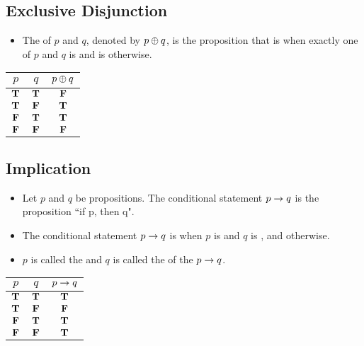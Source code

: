   \subsection{Exclusive Disjunction}
      \begin{itemize}
        \item The  of $p$ and $q$, denoted by $p \oplus q$, is the proposition that is  when
        exactly one of $p$ and $q$ is  and is  otherwise.
      \end{itemize}

    \begin{center}
      \begin{tabular}{|c|c|c|}
        \hline
        $p$ & $q$ & $p \oplus q$ \\
        \hline
        $\mathbf{T}$ & $\mathbf{T}$ & $\mathbf{F}$ \\
        \hline
        $\mathbf{T}$ & $\mathbf{F}$ & $\mathbf{T}$ \\
        \hline
        $\mathbf{F}$ & $\mathbf{T}$ & $\mathbf{T}$ \\
        \hline
        $\mathbf{F}$ & $\mathbf{F}$ & $\mathbf{F}$ \\
        \hline
      \end{tabular}
    \end{center}

  \subsection{Implication}
      \begin{itemize}
        \item Let $p$ and $q$ be propositions. The conditional statement $p \rightarrow q$ is the proposition ``if p, then q".
        \item The conditional statement $p \rightarrow q$ is  when $p$
        is  and $q$ is , and  otherwise.
        \item $p$ is called the  and $q$ is called the  of the  $p \rightarrow q$. \fnmark
      \end{itemize}

      \begin{center}
        \begin{tabular}{|c|c|c|}
          \hline
          $p$ & $q$ & $p \rightarrow q$ \\
          \hline
          $\mathbf{T}$ & $\mathbf{T}$ & $\mathbf{T}$ \\
          \hline
          $\mathbf{T}$ & $\mathbf{F}$ & $\mathbf{F}$ \\
          \hline
          $\mathbf{F}$ & $\mathbf{T}$ & $\mathbf{T}$ \\
          \hline
          $\mathbf{F}$ & $\mathbf{F}$ & $\mathbf{T}$ \\
          \hline
        \end{tabular}
      \end{center}

